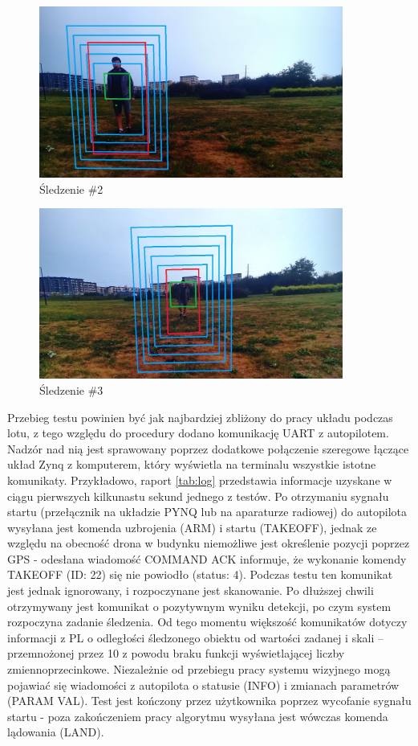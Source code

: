\begin{figure}[h]
	\centering
	\includegraphics[width=10cm]{6_track_2.jpg}
	\caption{Śledzenie \#2}
	\label{fig:track_1}
\end{figure}

\begin{figure}[h]
	\centering
	\includegraphics[width=10cm]{6_track_3.jpg}
	\caption{Śledzenie \#3}
	\label{fig:track_1}
\end{figure}

 Przebieg testu powinien być jak najbardziej zbliżony do pracy układu podczas lotu, z tego względu do procedury dodano komunikację UART z autopilotem. Nadzór nad nią jest sprawowany poprzez dodatkowe połączenie szeregowe łączące układ Zynq z komputerem, który wyświetla na terminalu wszystkie istotne komunikaty. Przykładowo, raport \ref{tab:log} przedstawia informacje uzyskane w ciągu pierwszych kilkunastu sekund jednego z testów. Po otrzymaniu sygnału startu (przełącznik na układzie PYNQ lub na aparaturze radiowej) do autopilota wysyłana jest komenda uzbrojenia (ARM) i startu (TAKEOFF), jednak ze względu na obecność drona w budynku niemożliwe jest określenie pozycji poprzez GPS - odesłana wiadomość COMMAND ACK informuje, że wykonanie komendy TAKEOFF (ID: 22) się nie powiodło (status: 4). Podczas testu ten komunikat jest jednak ignorowany, i rozpoczynane jest skanowanie. Po dłuższej chwili otrzymywany jest komunikat o pozytywnym wyniku detekcji, po czym system rozpoczyna zadanie śledzenia. Od tego momentu większość komunikatów dotyczy informacji z PL o odległości śledzonego obiektu od wartości zadanej i skali -- przemnożonej przez 10 z powodu braku funkcji wyświetlającej liczby zmiennoprzecinkowe. Niezależnie od przebiegu pracy systemu wizyjnego mogą pojawiać się wiadomości z autopilota o statusie (INFO) i zmianach parametrów (PARAM VAL). Test jest kończony przez użytkownika poprzez wycofanie sygnału startu - poza zakończeniem pracy algorytmu wysyłana jest wówczas komenda lądowania (LAND).
 
